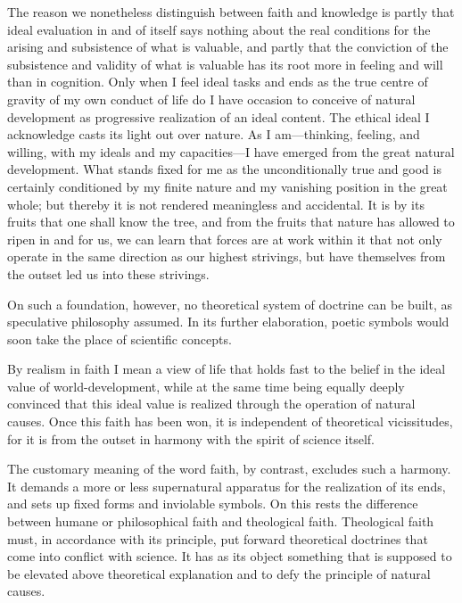 \documentclass[12pt,a4paper]{article}
\begin{document}
The reason we nonetheless distinguish between faith and knowledge is
partly that ideal evaluation in and of itself says nothing about the real
conditions for the arising and subsistence of what is valuable, and partly
that the conviction of the subsistence and validity of what is valuable
has its root more in feeling and will than in cognition. Only when I feel
ideal tasks and ends as the true centre of gravity of my own conduct of
life do I have occasion to conceive of natural development as progressive
realization of an ideal content. The ethical ideal I acknowledge casts its
light out over nature. As I am---thinking, feeling, and willing, with my
ideals and my capacities---I have emerged from the great natural
development. What stands fixed for me as the unconditionally true and good
is certainly conditioned by my finite nature and my vanishing position in
the great whole; but thereby it is not rendered meaningless and
accidental. It is by its fruits that one shall know the tree, and from the
fruits that nature has allowed to ripen in and for us, we can learn that
forces are at work within it that not only operate in the same direction
as our highest strivings, but have themselves from the outset led us into
these strivings.

On such a foundation, however, no theoretical system of doctrine can be
built, as speculative philosophy assumed. In its further elaboration,
poetic symbols would soon take the place of scientific concepts.

By realism in faith I mean a view of life that holds fast to the belief
in the ideal value of world-development, while at the same time being
equally deeply convinced that this ideal value is realized through the
operation of natural causes. Once this faith has been won, it is
independent of theoretical vicissitudes, for it is from the outset in
harmony with the spirit of science itself.

The customary meaning of the word faith, by contrast, excludes such a
harmony. It demands a more or less supernatural apparatus for the
realization of its ends, and sets up fixed forms and inviolable symbols.
On this rests the difference between humane or philosophical faith and
theological faith. Theological faith must, in accordance with its
principle, put forward theoretical doctrines that come into conflict with
science. It has as its object something that is supposed to be elevated
above theoretical explanation and to defy the principle of natural causes.
\end{document}
